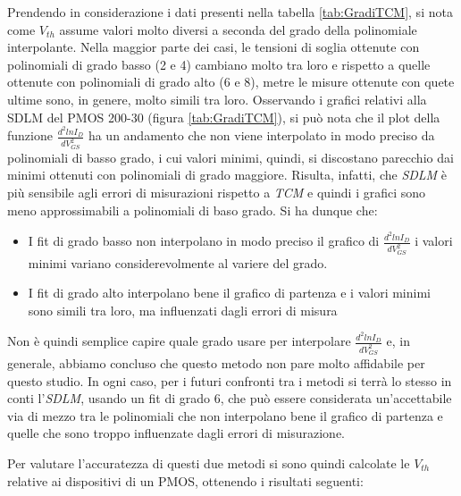 \documentclass[12pt, letterpaper]{book}
\begin{document}
Prendendo in considerazione i dati presenti nella tabella \ref{tab:GradiTCM}, si nota come $V_{th}$ assume valori molto diversi a seconda del grado della polinomiale interpolante. Nella maggior parte dei casi, le tensioni di soglia ottenute con polinomiali di grado basso (2 e 4) cambiano molto tra loro e rispetto a quelle ottenute con polinomiali di grado alto (6 e 8), metre le misure ottenute con quete ultime sono, in genere, molto simili tra loro. Osservando i grafici relativi alla SDLM del PMOS 200-30 (figura \ref{tab:GradiTCM}), si può nota che il plot della funzione $\frac{d^2lnI_D}{dV_{GS}^2}$ ha un andamento che non viene interpolato in modo preciso da polinomiali di basso grado, i cui valori minimi, quindi, si discostano parecchio dai minimi ottenuti con polinomiali di grado maggiore. Risulta, infatti, che \emph{SDLM} è più sensibile agli errori di misurazioni rispetto a \emph{TCM} e quindi i grafici sono meno approssimabili a polinomiali di baso grado. Si ha dunque che:
\begin{itemize}
  \item I fit di grado basso non interpolano in modo preciso il grafico di $\frac{d^2lnI_D}{dV_{GS}^2}$ i valori minimi variano considerevolmente al variere del grado.
  \item I fit di grado alto interpolano bene il grafico di partenza e i valori minimi sono simili tra loro, ma influenzati dagli errori di misura
\end{itemize}

Non è quindi semplice capire quale grado usare per interpolare $\frac{d^2lnI_D}{dV_{GS}^2}$ e, in generale, abbiamo concluso che questo metodo non pare molto affidabile per questo studio. In ogni caso, per i futuri confronti tra i metodi si terrà lo stesso in conti l'\emph{SDLM}, usando un fit di grado 6, che può essere considerata un'accettabile via di mezzo tra le polinomiali che non interpolano bene il grafico di partenza e quelle che sono troppo influenzate dagli errori di misurazione.









Per valutare l'accuratezza di questi due metodi si sono quindi calcolate le $V_{th}$ relative ai dispositivi di un PMOS, ottenendo i risultati seguenti:
\end{document}
